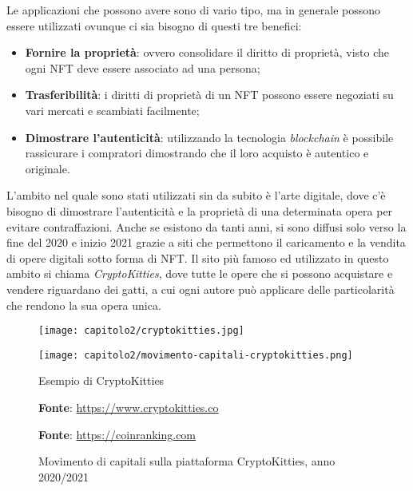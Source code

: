 \noindent Le applicazioni che possono avere sono di vario tipo, ma in generale possono essere utilizzati ovunque ci sia bisogno di questi tre benefici:
\begin{itemize}
  \item \textbf{Fornire la proprietà}: ovvero consolidare il diritto di proprietà, visto che ogni NFT deve essere associato ad una persona;
  \item \textbf{Trasferibilità}: i diritti di proprietà di un NFT possono essere negoziati su vari mercati e scambiati facilmente;
  \item \textbf{Dimostrare l'autenticità}: utilizzando la tecnologia \textit{blockchain} è possibile rassicurare i compratori dimostrando che il loro acquisto è autentico e originale.
\end{itemize}

L'ambito nel quale sono stati utilizzati sin da subito è l'arte digitale, dove c'è bisogno di dimostrare l'autenticità e la proprietà di una determinata opera per evitare contraffazioni.
Anche se esistono da tanti anni, si sono diffusi solo verso la fine del 2020 e inizio 2021 grazie a siti che permettono il caricamento e la vendita di opere digitali sotto forma di NFT. Il sito più famoso ed utilizzato in questo ambito si chiama \textit{CryptoKitties}, dove tutte le opere che si possono acquistare e vendere riguardano dei gatti, a cui ogni autore può applicare delle particolarità che rendono la sua opera unica.

\begin{figure}[!tbph]
  \captionsetup{singlelinecheck = false, format= hang, justification=raggedright, font=footnotesize, labelsep=space}

  \centering

  \begin{minipage}{0.5\textwidth}
    \texttt{[image: capitolo2/cryptokitties.jpg]}
  \end{minipage}%
  \begin{minipage}{0.5\textwidth}
    \texttt{[image: capitolo2/movimento-capitali-cryptokitties.png]}
  \end{minipage}

  \begin{minipage}[t]{0.5\textwidth}
    \caption{Esempio di CryptoKitties}
    \textbf{Fonte}: \href{https://www.cryptokitties.co}{https://www.cryptokitties.co}
  \end{minipage}%
  \begin{minipage}[t]{0.5\textwidth}
    \caption{Movimento di capitali sulla piattaforma CryptoKitties, anno 2020/2021}
    \textbf{Fonte}: \href{https://coinranking.com/dapp/cryptokitties}{https://coinranking.com}
  \end{minipage}
\end{figure}

